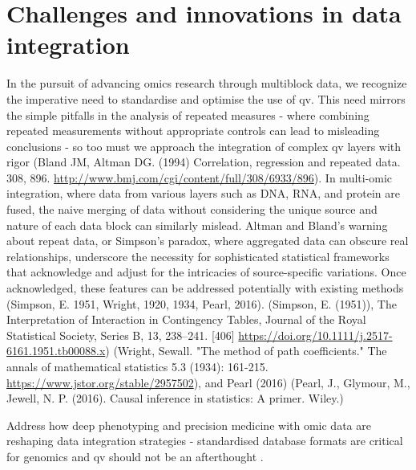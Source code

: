 \section{Challenges and innovations in data integration}
In the pursuit of advancing omics research through multiblock data, we recognize the imperative need to standardise and optimise the use of \ac{qv}. 
This need mirrors the simple pitfalls in the analysis of repeated measures
 - where combining repeated measurements without appropriate controls can lead to misleading conclusions - 
 so too must we approach the integration of complex \ac{qv} layers with rigor
 (Bland JM, Altman DG. (1994) Correlation, regression and repeated data. 308, 896. \url{http://www.bmj.com/cgi/content/full/308/6933/896}).
In multi-omic integration, where data from various layers such as DNA, RNA, and protein are fused, the naive merging of data without considering the unique source and nature of each data block can similarly mislead. 
Altman and Bland's  warning about repeat data, or Simpson's paradox, where aggregated data can obscure real relationships, underscore the necessity for sophisticated statistical frameworks that acknowledge and adjust for the intricacies of source-specific variations.
Once acknowledged, these features can be addressed potentially with existing methods
(Simpson, E. 1951, 
Wright, 1920, 1934, 
Pearl, 2016).
(Simpson, E. (1951)), The Interpretation of Interaction in Contingency Tables, Journal of the Royal Statistical Society, Series B, 13, 238–241. [406] \url{https://doi.org/10.1111/j.2517-6161.1951.tb00088.x})
(Wright, Sewall. "The method of path coefficients." The annals of mathematical statistics 5.3 (1934): 161-215.
\url{https://www.jstor.org/stable/2957502}),
and Pearl (2016) (Pearl, J., Glymour, M.,  Jewell, N. P. (2016). Causal inference in statistics: A primer. Wiley.) 

Address how deep phenotyping and precision medicine with omic data are reshaping data integration strategies - standardised database formats are critical for genomics and \ac{qv} should not be an afterthought \cite{bycroft2018uk, all2024genomic, ogishima2021dbtmm}.

